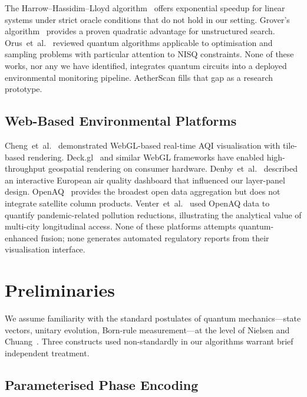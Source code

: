 \documentclass[conference]{IEEEtran}
\begin{document}
The Harrow--Hassidim--Lloyd algorithm~\cite{harrow2009quantum} offers
exponential speedup for linear systems under strict oracle conditions that
do not hold in our setting.
Grover's algorithm~\cite{grover1996fast} provides a proven quadratic
advantage for unstructured search.
Orus~et~al.~\cite{orus2019quantum} reviewed quantum algorithms applicable
to optimisation and sampling problems with particular attention to NISQ
constraints.
None of these works, nor any we have identified, integrates quantum circuits
into a deployed environmental monitoring pipeline.
AetherScan fills that gap as a research prototype.

\subsection{Web-Based Environmental Platforms}

Cheng~et~al.~\cite{cheng2021realtime} demonstrated WebGL-based real-time
AQI visualisation with tile-based rendering.
Deck.gl~\cite{deckgl2019} and similar WebGL frameworks have enabled
high-throughput geospatial rendering on consumer hardware.
Denby~et~al.~\cite{denby2011dashboard} described an interactive European
air quality dashboard that influenced our layer-panel design.
OpenAQ~\cite{openaq2016} provides the broadest open data
aggregation but does not integrate satellite column products.
Venter~et~al.~\cite{venter2020covid} used OpenAQ data to quantify
pandemic-related pollution reductions, illustrating the analytical value
of multi-city longitudinal access.
None of these platforms attempts quantum-enhanced fusion; none generates
automated regulatory reports from their visualisation interface.


\section{Preliminaries}\label{sec:prelim}

We assume familiarity with the standard postulates of quantum
mechanics---state vectors, unitary evolution, Born-rule measurement---at
the level of Nielsen and Chuang~\cite{nielsen2010quantum}.
Three constructs used non-standardly in our algorithms warrant brief
independent treatment.

\subsection{Parameterised Phase Encoding}
\end{document}
